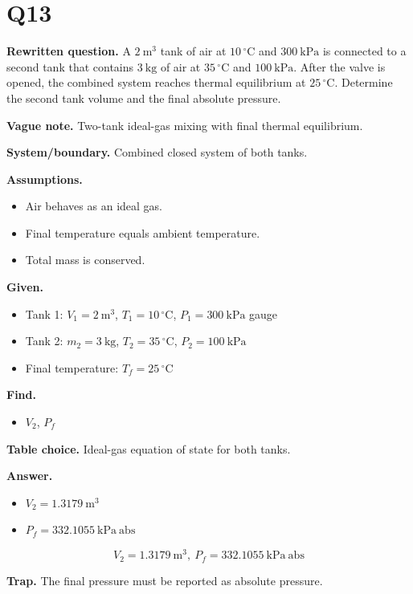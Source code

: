 \section*{Q13}
\textbf{Rewritten question.} A $2\ \mathrm{m^3}$ tank of air at $10\,^{\circ}\mathrm{C}$ and $300\ \mathrm{kPa}$ is connected to a second tank that contains $3\ \mathrm{kg}$ of air at $35\,^{\circ}\mathrm{C}$ and $100\ \mathrm{kPa}$. After the valve is opened, the combined system reaches thermal equilibrium at $25\,^{\circ}\mathrm{C}$. Determine the second tank volume and the final absolute pressure.

\textbf{Vague note.} Two-tank ideal-gas mixing with final thermal equilibrium.

\textbf{System/boundary.} Combined closed system of both tanks.

\textbf{Assumptions.}
\begin{itemize}
  \item Air behaves as an ideal gas.
  \item Final temperature equals ambient temperature.
  \item Total mass is conserved.
\end{itemize}

\textbf{Given.}
\begin{itemize}
  \item Tank 1: $V_1 = 2\ \mathrm{m^3}$, $T_1 = 10\,^{\circ}\mathrm{C}$, $P_1 = 300\ \mathrm{kPa}$ gauge
  \item Tank 2: $m_2 = 3\ \mathrm{kg}$, $T_2 = 35\,^{\circ}\mathrm{C}$, $P_2 = 100\ \mathrm{kPa}$
  \item Final temperature: $T_f = 25\,^{\circ}\mathrm{C}$
\end{itemize}

\textbf{Find.}
\begin{itemize}
  \item $V_2$, $P_f$
\end{itemize}

\textbf{Table choice.} Ideal-gas equation of state for both tanks.

\textbf{Answer.}
\begin{itemize}
  \item $V_2 = 1.3179\ \mathrm{m^3}$
  \item $P_f = 332.1055\ \mathrm{kPa\ abs}$
\end{itemize}

\[\boxed{V_2 = 1.3179\ \mathrm{m^3},\ P_f = 332.1055\ \mathrm{kPa\ abs}}\]

\textbf{Trap.} The final pressure must be reported as absolute pressure.

